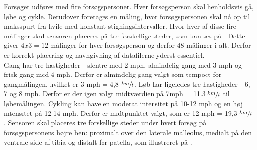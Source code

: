 Forsøget udføres med fire forsøgspersoner. Hver forsøgsperson skal henholdsvis gå, løbe og cykle. Derudover foretages en måling, hvor forsøgspersonen skal nå op til maksspurt fra hvile med konstant stigningsintervaller. Hvor hver af disse fire målinger skal sensoren placeres på tre forskellige steder, som kan ses på . Dette giver $4 x 3 = 12$ målinger for hver forsøgsperson og derfor 48 målinger i alt. Derfor er korrekt placering og navngivning af datafilerne yderst essentiel. \\ 
Gang har tre hastigheder - slentre med 2 mph, almindelig gang med 3 mph og frisk gang med 4 mph. Derfor er almindelig gang valgt som tempoet for gangmålingen, hvilket er 3 mph = 4,8 $\sfrac{km}{t}$. Løb har ligeledes tre hastigheder - 6, 7 og 8 mph. Derfor er der igen valgt midtværdien på 7mph = 11.3 $\sfrac{km}{t}$ til løbemålingen. Cykling kan have en moderat intensitet på 10-12 mph og en høj intensitet på 12-14 mph. Derfor er midtpunktet valgt, som er 12 mph = 19,3 $\sfrac{km}{t}$. \citep{Miles2007}
Sensoren skal placeres tre forskellige steder under hvert forsøg på forsøgspersonens højre ben: proximalt over den laterale malleolus, medialt på den ventrale side af tibia og distalt for patella, som illustreret på .
